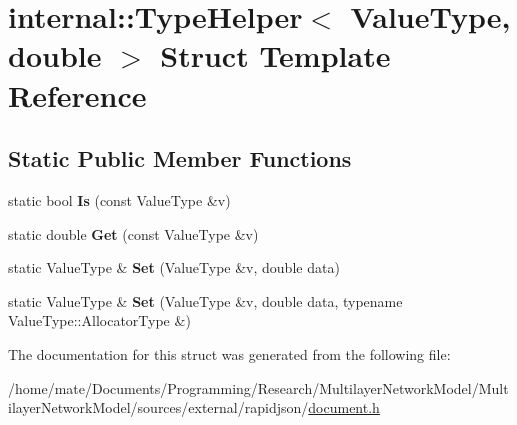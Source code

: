 \hypertarget{structinternal_1_1TypeHelper_3_01ValueType_00_01double_01_4}{}\section{internal\+:\+:Type\+Helper$<$ Value\+Type, double $>$ Struct Template Reference}
\label{structinternal_1_1TypeHelper_3_01ValueType_00_01double_01_4}
\subsection*{Static Public Member Functions}
\begin{DoxyCompactItemize}
\item 
static bool {\bfseries Is} (const Value\+Type \&v)\hypertarget{structinternal_1_1TypeHelper_3_01ValueType_00_01double_01_4_a6c265a3202beb9bd85ecc7896a8ab9dd}{}\label{structinternal_1_1TypeHelper_3_01ValueType_00_01double_01_4_a6c265a3202beb9bd85ecc7896a8ab9dd}

\item 
static double {\bfseries Get} (const Value\+Type \&v)\hypertarget{structinternal_1_1TypeHelper_3_01ValueType_00_01double_01_4_ac55a96d2abd1dd6718a6cb3d6690aa38}{}\label{structinternal_1_1TypeHelper_3_01ValueType_00_01double_01_4_ac55a96d2abd1dd6718a6cb3d6690aa38}

\item 
static Value\+Type \& {\bfseries Set} (Value\+Type \&v, double data)\hypertarget{structinternal_1_1TypeHelper_3_01ValueType_00_01double_01_4_a2b332dd6083278283289e107caff879b}{}\label{structinternal_1_1TypeHelper_3_01ValueType_00_01double_01_4_a2b332dd6083278283289e107caff879b}

\item 
static Value\+Type \& {\bfseries Set} (Value\+Type \&v, double data, typename Value\+Type\+::\+Allocator\+Type \&)\hypertarget{structinternal_1_1TypeHelper_3_01ValueType_00_01double_01_4_a69f7d942a569f3acdeb64127b2ecd9eb}{}\label{structinternal_1_1TypeHelper_3_01ValueType_00_01double_01_4_a69f7d942a569f3acdeb64127b2ecd9eb}

\end{DoxyCompactItemize}


The documentation for this struct was generated from the following file\+:\begin{DoxyCompactItemize}
\item 
/home/mate/\+Documents/\+Programming/\+Research/\+Multilayer\+Network\+Model/\+Multilayer\+Network\+Model/sources/external/rapidjson/\hyperlink{document_8h}{document.\+h}\end{DoxyCompactItemize}
